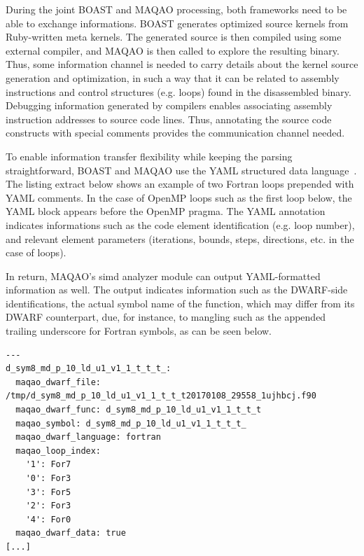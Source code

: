 \documentclass[11pt, a4paper, twoside]{montblanc2}
\begin{document}

During the joint BOAST and MAQAO processing, both frameworks need to be able to exchange 
informations. BOAST generates optimized source kernels from Ruby-written meta kernels. The generated 
source is then compiled using some external compiler, and MAQAO is then called to explore the 
resulting binary. Thus, some information channel is needed to carry details about the kernel source 
generation and optimization, in such a way that it can be related to assembly instructions and 
control structures (e.g. loops) found in the disassembled binary. Debugging information generated by 
compilers enables associating assembly instruction addresses to source code lines. Thus, annotating 
the source code constructs with special comments provides the communication channel needed.

To enable information transfer flexibility while keeping the parsing straightforward, BOAST and 
MAQAO use the YAML structured data language~\cite{yaml:2017}. The listing extract below shows an 
example of two Fortran loops prepended with YAML comments. In the case of OpenMP loops such as the 
first loop below, the YAML block appears before the OpenMP pragma. The YAML annotation indicates 
informations such as the code element identification (e.g. loop number), and relevant element 
parameters (iterations, bounds, steps, directions, etc. in the case of loops).



In return, MAQAO's simd analyzer module can output YAML-formatted information
as well. The output indicates information such as the DWARF-side
identifications, the actual symbol name of the function, which may differ from
its DWARF counterpart, due, for instance, to mangling such as the appended
trailing underscore for Fortran symbols, as can be seen below.

\begin{verbatim}
---
d_sym8_md_p_10_ld_u1_v1_1_t_t_t_:
  maqao_dwarf_file: /tmp/d_sym8_md_p_10_ld_u1_v1_1_t_t_t20170108_29558_1ujhbcj.f90
  maqao_dwarf_func: d_sym8_md_p_10_ld_u1_v1_1_t_t_t
  maqao_symbol: d_sym8_md_p_10_ld_u1_v1_1_t_t_t_
  maqao_dwarf_language: fortran
  maqao_loop_index:
    '1': For7
    '0': For3
    '3': For5
    '2': For3
    '4': For0
  maqao_dwarf_data: true
[...]
\end{verbatim}
\end{document}
